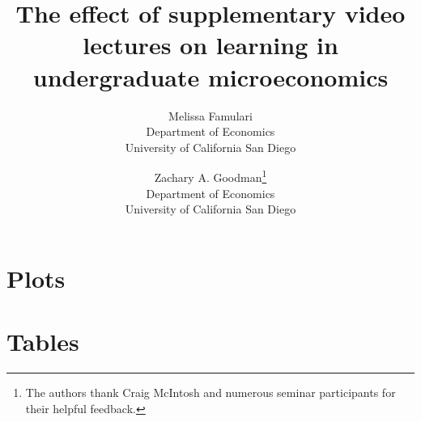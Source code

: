 \documentclass[10pt, letterpaper, landscape]{article}
\title{The effect of supplementary video lectures on learning in undergraduate microeconomics}
\author{%
	Melissa Famulari\\
	\small Department of Economics\\
	\small University of California San Diego\\
	\and
	Zachary A. Goodman\thanks{The authors thank Craig McIntosh and numerous seminar participants for their helpful feedback.}\\
	\small Department of Economics\\
	\small University of California San Diego\\
}
\begin{document}

\newpage


	
%
{}
\pagediagram   %
\pagevalues
\currentpage

\section{Plots} \bigskip




\section{Tables} \newpage













%
\end{document}
